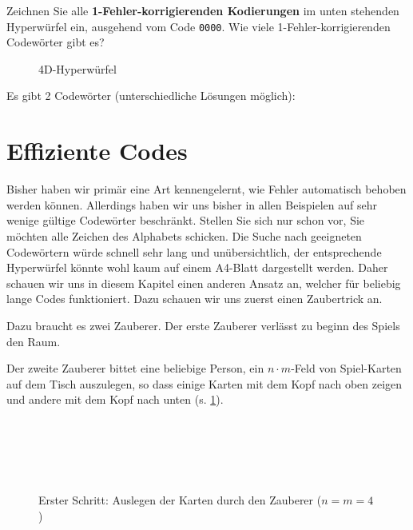 \begin{myexercise}
Zeichnen Sie alle \textbf{1-Fehler-korrigierenden Kodierungen} im unten stehenden Hyperwürfel ein, ausgehend vom Code \texttt{0000}. Wie viele 1-Fehler-korrigierenden Codewörter gibt es?
\begin{figure}[H]
\centering
{}
\caption{4D-Hyperwürfel}
\end{figure}

\begin{myanswer}
Es gibt 2 Codewörter (unterschiedliche Lösungen möglich):

\begin{figure}[H]
\centering
{}
\end{figure}
\end{myanswer}
\end{myexercise}


\section{Effiziente Codes}

Bisher haben wir primär eine Art kennengelernt, wie Fehler automatisch behoben werden können. Allerdings haben wir uns bisher in allen Beispielen auf sehr wenige gültige Codewörter beschränkt. Stellen Sie sich nur schon vor, Sie möchten alle Zeichen des Alphabets schicken. Die Suche nach geeigneten Codewörtern würde schnell sehr lang und unübersichtlich, der entsprechende Hyperwürfel könnte wohl kaum auf einem A4-Blatt dargestellt werden. Daher schauen wir uns in diesem Kapitel einen anderen Ansatz an, welcher für beliebig lange Codes funktioniert. Dazu schauen wir uns zuerst einen Zaubertrick an.

Dazu braucht es zwei Zauberer. Der erste Zauberer verlässt zu beginn des Spiels den Raum.

Der zweite Zauberer bittet eine beliebige Person, ein $n\cdot m$-Feld von Spiel-Karten auf dem Tisch auszulegen, so dass einige Karten mit dem Kopf nach oben zeigen und andere mit dem Kopf nach unten (s. \cref{fig:zauberer-1}).

\begin{figure}[H]
\centering
{}\\
\\
\\
\\
\caption{Erster Schritt: Auslegen der Karten durch den Zauberer ($n=m=4$)}
\label{fig:zauberer-1}
\end{figure}


